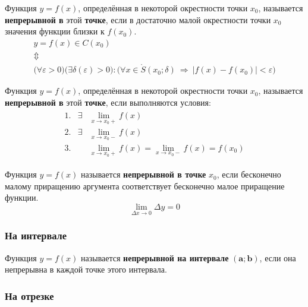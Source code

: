 \begin{definition}
  Функция $y = f(x)$, определённая в некоторой окрестности точки $x_0$, называется \textbf{непрерывной в} этой \textbf{точке}, если в достаточно малой окрестности точки $x_0$ значения функции близки к $f(x_0)$.
  \begin{gather*}
    y = f(x) \in C(x_0) \\
    \Updownarrow \\
    \big(\forall  \varepsilon > 0\big)\big(\exists \delta(\varepsilon) > 0\big)\colon\big(\forall x \in \mathring{S}(x_0; \delta)\ \Rightarrow\ |f(x) - f(x_0)| < \varepsilon\big)  
  \end{gather*}
\end{definition}

\begin{definition}
  Функция $y = f(x)$, определённая в некоторой окрестности точки $x_0$, называется \textbf{непрерывной в} этой \textbf{точке}, если выполняются условия:
  \begin{gather*}
    \begin{array}{rrl}
      1. & \exists &\lim\limits_{x \to x_0+} f(x) \\[2ex]
      2. & \exists &\lim\limits_{x \to x_0-} f(x) \\[2ex]
      3. &  &\lim\limits_{x \to x_0+} f(x) = \lim\limits_{x \to x_0-} f(x) = f(x_0) 
    \end{array}
  \end{gather*}
\end{definition}

\begin{definition} 
  Функция $y = f(x)$ называется \textbf{непрерывной в точке} $x_0$, если бесконечно малому приращению аргумента соответствует бесконечно малое приращение функции. \[ \lim_{\Delta x \to 0} \Delta y = 0 \] 
\end{definition}

\subsubsection{На интервале}

\begin{definition}
  Функция $y = f(x)$ называется \textbf{непрерывной на интервале} $\bm{(a; b)}$, если она непрерывна в каждой точке этого интервала.
\end{definition}

\subsubsection{На отрезке}

